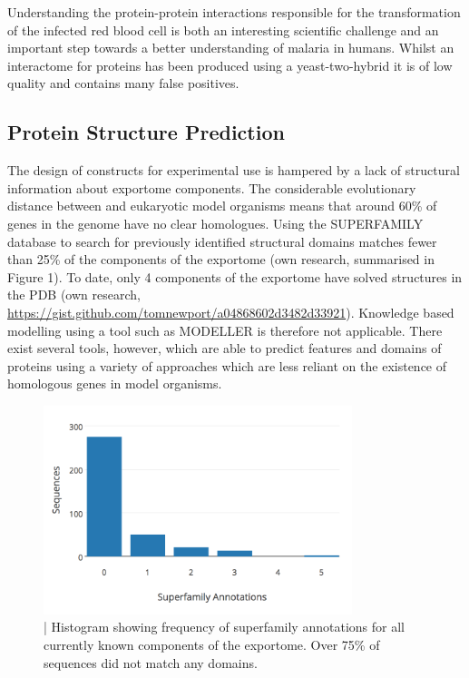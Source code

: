 \documentclass[fleqn,10pt]{article} %
\begin{document}
Understanding the protein-protein interactions responsible for the transformation of the infected red blood cell is both an interesting scientific challenge and an important step towards a better understanding of malaria in humans. Whilst an interactome for \pf proteins has been produced using a yeast-two-hybrid \cite{LaCount2005} it is of low quality and contains many false positives.

\subsection{Protein Structure Prediction}

The design of constructs for experimental use is hampered by a lack of structural information about \pf exportome components. The considerable evolutionary distance between \pf and eukaryotic model organisms means that around 60\% of genes in the \pf genome have no clear homologues\cite{Wuchty2007, Date2006}. Using the SUPERFAMILY database to search for previously identified structural domains matches fewer than 25\% of the components of the \pf exportome (own research, summarised in Figure 1). To date, only 4 components of the \pf exportome have solved structures in the PDB (own research, \url{https://gist.github.com/tomnewport/a04868602d3482d33921}). Knowledge based modelling using a tool such as MODELLER \cite{Eswar2007} is therefore not applicable. There exist several tools, however, which are able to predict features and domains of proteins using a variety of approaches which are less reliant on the existence of homologous genes in model organisms.

\begin{figure}
\includegraphics[width=9cm]{figs/scopresults}
\caption{ | Histogram showing frequency of superfamily annotations for all currently known components of the \pf exportome. Over 75\% of sequences did not match any domains.}
\end{figure}
\end{document}
